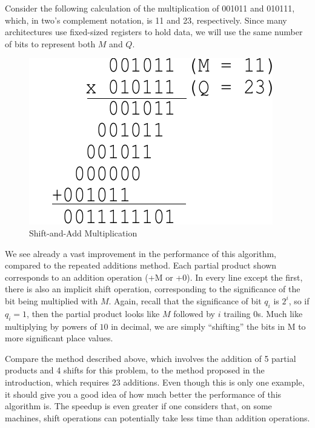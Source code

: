 \documentclass{article}
\begin{document}
Consider the following calculation of the multiplication of 001011 and 010111, which, in two's complement notation, is 11 and 23, respectively.
Since many architectures use fixed-sized registers to hold data, we will use the same number of bits to represent both $M$ and $Q$.
\pagebreak
\begin{figure}
\centering
\includegraphics[scale=0.7]{saam3.pdf}
\caption{Shift-and-Add Multiplication}
\end{figure}

We see already a vast improvement in the performance of this algorithm, compared to the repeated additions method.
Each partial product shown corresponds to an addition operation (+M or +0).
In every line except the first, there is also an implicit shift operation, corresponding to the significance of the bit being multiplied with $M$.
Again, recall that the significance of bit $q_i$ is $2^i$, so if $q_i = 1$, then the partial product looks like $M$ followed by $i$ trailing 0s.
Much like multiplying by powers of $10$ in decimal, we are simply ``shifting'' the bits in M to more significant place values.

Compare the method described above, which involves the addition of 5 partial products and 4 shifts for this problem, to the method proposed in the introduction, which requires 23 additions.
Even though this is only one example, it should give you a good idea of how much better the performance of this algorithm is.
The speedup is even greater if one considers that, on some machines, shift operations can potentially take less time than addition operations.

\pagebreak
\end{document}
